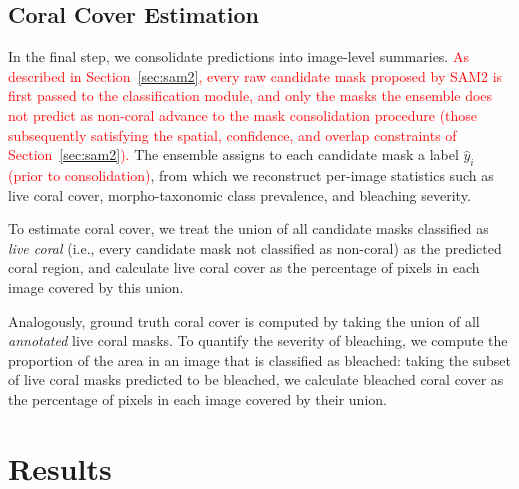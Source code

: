 \documentclass[11pt]{elsarticle}
\newcommand{\revadd}[1]{\textcolor{red}{#1}}
\newcommand{\revdel}[1]{%
  \sbox\revdelbox{#1}%
  \makebox[0pt][l]{\raisebox{0.45ex}{\rule{\wd\revdelbox}{0.4pt}}}\usebox\revdelbox
}
\begin{document}
\subsection{Coral Cover Estimation} \label{sec:reconstruct}

In the final step, we consolidate predictions into image-level summaries. \revadd{As described in Section~\ref{sec:sam2}, every raw candidate mask proposed by SAM2 is first passed to the classification module, and only the masks the ensemble does not predict as non-coral advance to the mask consolidation procedure (those subsequently satisfying the spatial, confidence, and overlap constraints of Section~\ref{sec:sam2}).} The ensemble \revdel{then }assigns to each candidate mask\revdel{ $m_i$} a label $\hat{y}_i$\revadd{ (prior to consolidation)}, from which we reconstruct per-image statistics such as live coral cover, morpho-taxonomic class prevalence, and bleaching severity.

To estimate coral cover, we treat the union of all candidate masks classified as \emph{live coral} (i.e., every candidate mask not classified as non-coral) as the predicted coral region, and calculate live coral cover as the percentage of pixels in each image covered by this union.

Analogously, ground truth coral cover is computed by taking the union of all \emph{annotated} live coral masks.
To quantify the severity of bleaching, we compute the proportion of the area in an image that is classified as bleached: taking the subset of live coral masks predicted to be bleached, we calculate bleached coral cover as the percentage of pixels in each image covered by their union.

\section{Results}
\label{sec:results}
\end{document}
